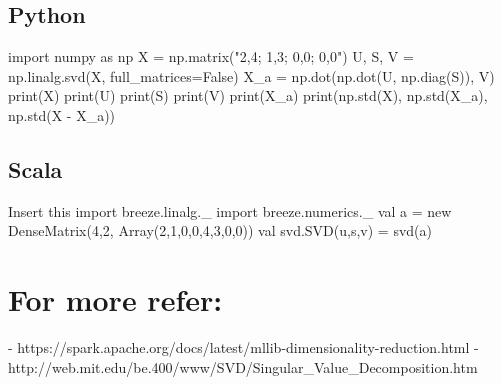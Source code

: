 \subsection{Python}
import numpy as np
X = np.matrix("2,4; 1,3; 0,0; 0,0")
U, S, V = np.linalg.svd(X, full_matrices=False)
X_a = np.dot(np.dot(U, np.diag(S)), V)
print(X)
print(U)
print(S)
print(V)
print(X_a)
print(np.std(X), np.std(X_a), np.std(X - X_a))

\subsection{Scala}
Insert this
import breeze.linalg._
import breeze.numerics._
val a = new DenseMatrix(4,2, Array(2,1,0,0,4,3,0,0))
val svd.SVD(u,s,v) = svd(a)

\section{For more refer:}
- https://spark.apache.org/docs/latest/mllib-dimensionality-reduction.html
- http://web.mit.edu/be.400/www/SVD/Singular_Value_Decomposition.htm

